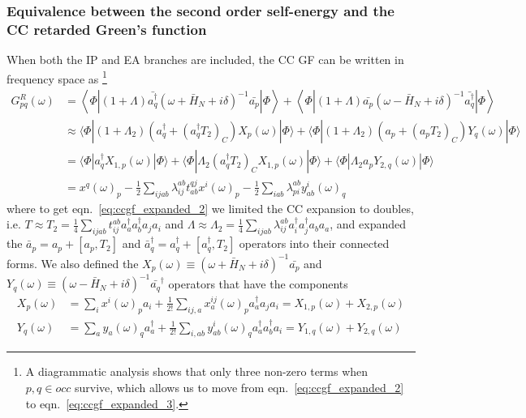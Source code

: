 \subsubsection{Equivalence between the second order self-energy and the CC retarded Green's function}
When both the IP and EA branches are included, the CC GF can be written in frequency space as
\footnote{A diagrammatic analysis shows that only three non-zero terms when $p, q \in o c c$ survive, which allows us to move from eqn.~\ref{eq:ccgf_expanded_2} to eqn.~\ref{eq:ccgf_expanded_3}.}
\begin{align}
G_{pq}^R (\omega) &= \left\langle \Phi \left| (1+\Lambda) \bar{a^{\dagger}_q}
(\omega + \bar{H}_N + i\delta)^{-1} \bar{a_p} \right| \Phi \right\rangle + \left\langle \Phi \left| (1+\Lambda) \bar{a_p}
(\omega - \bar{H}_N + i\delta)^{-1} \bar{a^{\dagger}_q} \right| \Phi \right\rangle \\
&\approx \langle\Phi|\left(1+\Lambda_2\right)\left(a_q^{\dagger}+\left(a_q^{\dagger} T_2\right)_C\right) X_p(\omega)|\Phi\rangle+\langle\Phi|\left(1+\Lambda_2\right)\left(a_p+\left(a_p T_2\right)_C\right) Y_q(\omega)|\Phi\rangle \label{eq:ccgf_expanded_2}\\
&= \langle\Phi| a_q^{\dagger} X_{1, p}(\omega)|\Phi\rangle+\langle\Phi| \Lambda_2\left(a_q^{\dagger} T_2\right)_C X_{1, p}(\omega)|\Phi\rangle+\langle\Phi| \Lambda_2 a_p Y_{2, q}(\omega)|\Phi\rangle \label{eq:ccgf_expanded_3} \\
&= x^q(\omega)_p-\frac{1}{2} \sum_{i j a b} \lambda_{i j}^{a b} t_{a b}^{q j} x^i(\omega)_p-\frac{1}{2} \sum_{i a b} \lambda_{p i}^{a b} y_{a b}^i(\omega)_q
\end{align}
where to get eqn.~\ref{eq:ccgf_expanded_2} we limited the CC expansion to doubles, i.e. $T\approx T_2=\frac{1}{4} \sum_{i j a b} t_{i j}^{a b} a_a^{\dagger} a_b^{\dagger} a_j a_i$ and $\Lambda\approx\Lambda_2=\frac{1}{4} \sum_{i j a b} \lambda_{i j}^{a b} a_i^{\dagger} a_j^{\dagger} a_b a_a$, and expanded the $\bar{a}_p = a_p + [a_p,T_2]$ and $\bar{a}_q^{\dagger} = a_q^{\dagger} + [a_q^{\dagger},T_2]$ operators into their connected forms. We also defined the $X_p(\omega)\equiv (\omega + \bar{H}_N + i\delta)^{-1} \bar{a_p}$ and $Y_q(\omega)\equiv (\omega - \bar{H}_N + i\delta)^{-1} \bar{a_q}^{\dagger}$ operators that have the components
\begin{align}
    X_p(\omega) & =\sum_i x^i(\omega)_p a_i+\frac{1}{2!} \sum_{i j, a} x_a^{i j}(\omega)_p a_a^{\dagger} a_j a_i=X_{1, p}(\omega)+X_{2, p}(\omega) \\
Y_q(\omega) & =\sum_a y_a(\omega)_q a_a^{\dagger}+\frac{1}{2!} \sum_{i, a b} y_{a b}^i(\omega)_q a_a^{\dagger} a_b^{\dagger} a_i=Y_{1, q}(\omega)+Y_{2, q}(\omega)
\end{align}
